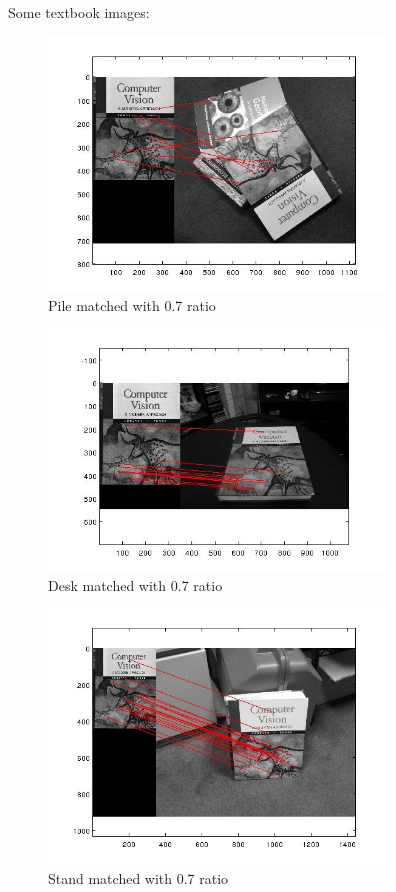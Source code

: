 \documentclass[11pt]{article}
\begin{document}
Some textbook images:
\begin{figure}[H]
\centering
\includegraphics[width=90mm]{pile.jpg}
\caption{Pile matched with 0.7 ratio }
\end{figure}

\begin{figure}[H]
\centering
\includegraphics[width=90mm]{desk.jpg}
\caption{Desk matched with 0.7 ratio }
\end{figure}

\begin{figure}[H]
\centering
\includegraphics[width=90mm]{stand.jpg}
\caption{Stand matched with 0.7 ratio }
\end{figure}
\end{document}
